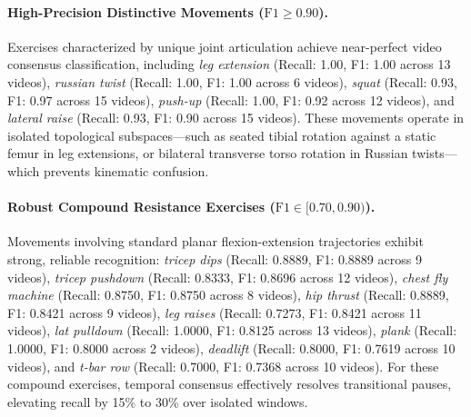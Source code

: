 \documentclass[runningheads]{llncs}
\begin{document}
\paragraph{High-Precision Distinctive Movements ($\text{F1} \ge 0.90$).} Exercises characterized by unique joint articulation achieve near-perfect video consensus classification, including \textit{leg extension} (Recall: 1.00, F1: 1.00 across 13 videos), \textit{russian twist} (Recall: 1.00, F1: 1.00 across 6 videos), \textit{squat} (Recall: 0.93, F1: 0.97 across 15 videos), \textit{push-up} (Recall: 1.00, F1: 0.92 across 12 videos), and \textit{lateral raise} (Recall: 0.93, F1: 0.90 across 15 videos). These movements operate in isolated topological subspaces---such as seated tibial rotation against a static femur in leg extensions, or bilateral transverse torso rotation in Russian twists---which prevents kinematic confusion.

\paragraph{Robust Compound Resistance Exercises ($\text{F1} \in [0.70, 0.90)$).} Movements involving standard planar flexion-extension trajectories exhibit strong, reliable recognition: \textit{tricep dips} (Recall: 0.8889, F1: 0.8889 across 9 videos), \textit{tricep pushdown} (Recall: 0.8333, F1: 0.8696 across 12 videos), \textit{chest fly machine} (Recall: 0.8750, F1: 0.8750 across 8 videos), \textit{hip thrust} (Recall: 0.8889, F1: 0.8421 across 9 videos), \textit{leg raises} (Recall: 0.7273, F1: 0.8421 across 11 videos), \textit{lat pulldown} (Recall: 1.0000, F1: 0.8125 across 13 videos), \textit{plank} (Recall: 1.0000, F1: 0.8000 across 2 videos), \textit{deadlift} (Recall: 0.8000, F1: 0.7619 across 10 videos), and \textit{t-bar row} (Recall: 0.7000, F1: 0.7368 across 10 videos). For these compound exercises, temporal consensus effectively resolves transitional pauses, elevating recall by 15\% to 30\% over isolated windows.
\end{document}
